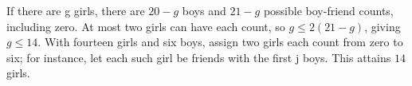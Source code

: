 If there are g girls, there are $20-g$ boys and $21-g$ possible boy-friend counts, including zero. At most two girls can have each count, so $g\le2(21-g)$, giving $g\le14$. With fourteen girls and six boys, assign two girls each count from zero to six; for instance, let each such girl be friends with the first j boys. This attains $\boxed{14}$ girls.
